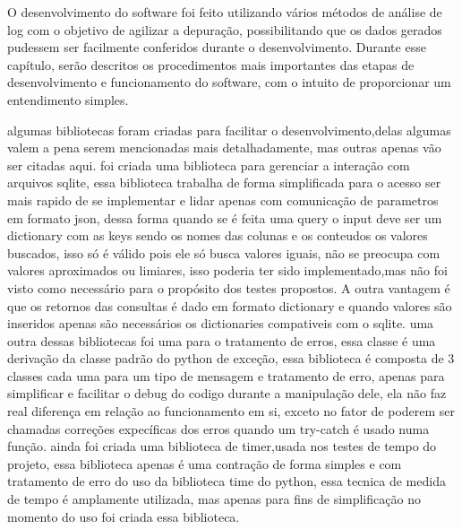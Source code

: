 \documentclass[
	12pt,				%
	openright,			%
	oneside,			%
	a4paper,			%
	english,			%
	french,				%
	spanish,			%
	brazil,				%
	]{abntex2}
\begin{document}
O desenvolvimento do software foi feito utilizando vários métodos de análise de log com o objetivo de agilizar a depuração,
possibilitando que os dados gerados pudessem ser facilmente conferidos durante o desenvolvimento.\newline
Durante esse capítulo, serão descritos os procedimentos mais importantes das etapas de desenvolvimento e funcionamento do software, com o intuito de proporcionar um entendimento simples.\newline

algumas bibliotecas foram criadas para facilitar o desenvolvimento,delas algumas valem a pena serem mencionadas mais detalhadamente,
mas outras apenas vão ser citadas aqui.
foi criada uma biblioteca para gerenciar a interação com arquivos sqlite,
essa biblioteca trabalha de forma simplificada para o acesso ser mais rapido de se implementar e lidar apenas com comunicação de parametros em formato json,
dessa forma quando se é feita uma query o input deve ser um dictionary com as keys sendo os nomes das colunas e os conteudos os valores buscados,
isso só é válido pois ele só busca valores iguais,
não se preocupa com valores aproximados ou limiares,
isso poderia ter sido implementado,mas não foi visto como necessário para o propósito dos testes propostos.
A outra vantagem é que os retornos das consultas é dado em formato dictionary e quando valores são inseridos apenas são necessários os dictionaries compativeis com o sqlite.
uma outra dessas bibliotecas foi uma para o tratamento de erros,
essa classe é uma derivação da classe padrão do python de exceção,
essa biblioteca é composta de 3 classes cada uma para um tipo de mensagem e tratamento de erro,
apenas para simplificar e facilitar o debug do codigo durante a manipulação dele,
ela não faz real diferença em relação ao funcionamento em si,
exceto no fator de poderem ser chamadas correções expecíficas dos erros quando um try-catch é usado numa função.
ainda foi criada uma biblioteca de timer,usada nos testes de tempo do projeto,
essa biblioteca apenas é uma contração de forma simples e com tratamento de erro do uso da biblioteca time do python,
essa tecnica de medida de tempo é amplamente utilizada,
mas apenas para fins de simplificação no momento do uso foi criada essa biblioteca.
\end{document}
